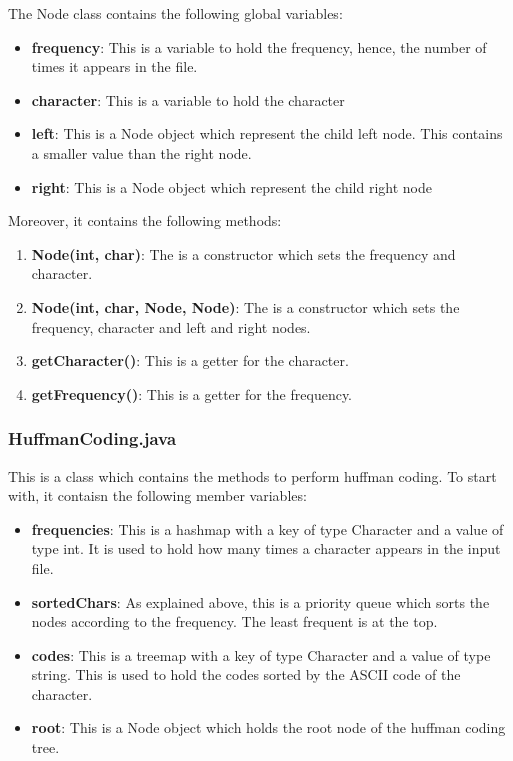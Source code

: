 \documentclass{article}
\begin{document}
		The Node class contains the following global variables:
		\begin{itemize}
			\item \textbf{frequency}: This is a variable to hold the frequency, hence, the number of times it appears in the file.
			\item \textbf{character}: This is a variable to hold the character
			\item \textbf{left}: This is a Node object which represent the child left node. This contains a smaller value than the right node.
			\item \textbf{right}: This is a Node object which represent the child right node
		\end{itemize}
		
		Moreover, it contains the following methods: 
		
		\begin{enumerate}
		\item \textbf{Node(int, char)}: The is a constructor which sets the frequency and character.
		\item \textbf{Node(int, char, Node, Node)}: The is a constructor which sets the frequency, character and left and right nodes.
		\item \textbf{getCharacter()}: This is a getter for the character.
		\item \textbf{getFrequency()}: This is a getter for the frequency.
		\end{enumerate}
		
		
		\subsubsection{HuffmanCoding.java}
		
		This is a class which contains the methods to perform huffman coding. To start with, it contaisn the following member variables:
		\begin{itemize}
			\item \textbf{frequencies}: This is a hashmap with a key of type Character and a value of type int. It is used to hold how many times a character appears in the input file.
			\item \textbf{sortedChars}: As explained above, this is a priority queue which sorts the nodes according to the frequency. The least frequent is at the top.
			\item \textbf{codes}: This is a treemap with a key of type Character and a value of type string. This is used to hold the codes sorted by the ASCII code of the character.
			\item \textbf{root}: This is a Node object which holds the root node of the huffman coding tree.
		\end{itemize}
		
\end{document}
